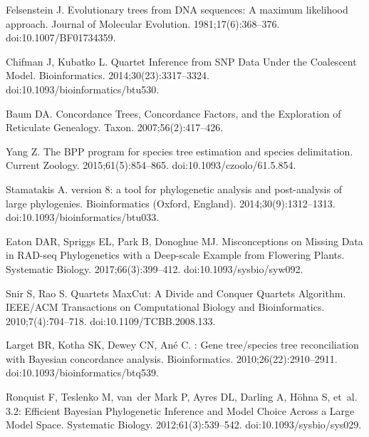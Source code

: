 \documentclass[10pt,letterpaper]{article}
\begin{document}
\begin{thebibliography}{10}
  Felsenstein J.
  \newblock Evolutionary trees from {DNA} sequences: {A} maximum likelihood
  approach.
  \newblock Journal of Molecular Evolution. 1981;17(6):368--376.
  \newblock doi:{10.1007/BF01734359}.

  Chifman J, Kubatko L.
  \newblock Quartet {Inference} from {SNP} {Data} {Under} the {Coalescent}
  {Model}.
  \newblock Bioinformatics. 2014;30(23):3317--3324.
  \newblock doi:{10.1093/bioinformatics/btu530}.

  Baum DA.
  \newblock Concordance {Trees}, {Concordance} {Factors}, and the {Exploration}
  of {Reticulate} {Genealogy}.
  \newblock Taxon. 2007;56(2):417--426.

  Yang Z.
  \newblock The {BPP} program for species tree estimation and species
  delimitation.
  \newblock Current Zoology. 2015;61(5):854--865.
  \newblock doi:{10.1093/czoolo/61.5.854}.

  Stamatakis A.
   version 8: a tool for phylogenetic analysis and post-analysis of large phylogenies.
  \newblock Bioinformatics (Oxford, England). 2014;30(9):1312--1313.
  \newblock doi:{10.1093/bioinformatics/btu033}.


  Eaton DAR, Spriggs EL, Park B, Donoghue MJ.
  \newblock Misconceptions on {Missing} {Data} in {RAD}-seq {Phylogenetics} with
  a {Deep}-scale {Example} from {Flowering} {Plants}.
  \newblock Systematic Biology. 2017;66(3):399--412.
  \newblock doi:{10.1093/sysbio/syw092}.

  
  Snir S, Rao S.
  \newblock Quartets {MaxCut}: {A} {Divide} and {Conquer} {Quartets} {Algorithm}.
  \newblock IEEE/ACM Transactions on Computational Biology and Bioinformatics.
  2010;7(4):704--718.
  \newblock doi:{10.1109/TCBB.2008.133}.

  Larget BR, Kotha SK, Dewey CN, Ané C.
  : {Gene} tree/species tree reconciliation with {Bayesian}
  concordance analysis.
  \newblock Bioinformatics. 2010;26(22):2910--2911.
  \newblock doi:{10.1093/bioinformatics/btq539}.
                                
  Ronquist F, Teslenko M, van~der Mark P, Ayres DL, Darling A, Höhna S, et~al.
   3.2: {Efficient} {Bayesian} {Phylogenetic} {Inference} and
  {Model} {Choice} {Across} a {Large} {Model} {Space}.
  \newblock Systematic Biology. 2012;61(3):539--542.
  \newblock doi:{10.1093/sysbio/sys029}.
         

\end{thebibliography}
\end{document}
